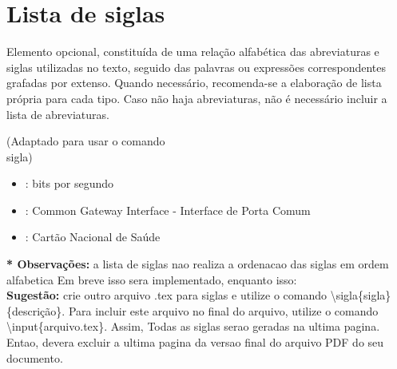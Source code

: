 \chapter{Lista de siglas}
\label{chap:siglas}

Elemento opcional, constituída de uma relação alfabética das abreviaturas e siglas utilizadas no texto, seguido das palavras ou expressões correspondentes grafadas por extenso. Quando necessário, recomenda-se a elaboração de lista própria para cada tipo. Caso não haja abreviaturas, não é necessário incluir a lista de abreviaturas. 

(Adaptado para usar o comando \\sigla)

\begin{itemize}
	\item {}: bits por segundo
	\item {}: Common Gateway Interface - Interface de Porta Comum
	\item {}: Cartão Nacional de Saúde
\end{itemize}


\textbf{* Observa\c{c}\~oes:} a lista de siglas nao realiza a ordenacao das siglas em ordem alfabetica
 Em breve isso sera implementado, enquanto isso: \\
\textbf{Sugest\~ao:} crie outro arquivo .tex para siglas e utilize o comando \textbackslash sigla\{sigla\}\{descri\c{c}\~ao\}.
Para incluir este arquivo no final do arquivo, utilize o comando \textbackslash input\{arquivo.tex\}.
Assim, Todas as siglas serao geradas na ultima pagina. Entao, devera excluir a ultima pagina da versao final do arquivo
 PDF do seu documento.
